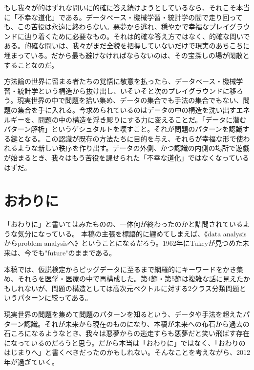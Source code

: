 もし我々が的はずれな問いに的確に答え続けようとしているなら、それこそ本当に「不幸な道化」である。データベース・機械学習・統計学の間で走り回っても、この苦役は永遠に終わらない。悪夢から逃れ、穏やかで幸福なプレイグラウンドに辿り着くために必要なもの。それは的確な答え方ではなく、的確な問いである。的確な問いは、我々がまだ全貌を把握していないだけで現実のあちこちに埋まっている。だから最も避けなければならないのは、その宝探しの場が閑散とすることなのだ。

方法論の世界に留まる者たちの覚悟に敬意を払ったら、データベース・機械学習・統計学という構造から抜け出し、いそいそと次のプレイグラウンドに移ろう。現実世界の中で問題を拾い集め、データの集合でも手法の集合でもない、問題の集合を手に入れる。今求められているのはデータの中の構造を洗い出すエネルギーを、問題の中の構造を浮き彫りにする力に変えることだ。「データに潜むパターン解析」というゲシュタルトを壊すこと。それが問題のパターンを認識する鍵となる。この認識が既存の方法たちに目的を与え、それらが幸福な形で使われるような新しい秩序を作り出す。データの外側、かつ認識の内側の場所で遊戯が始まるとき、我々はもう苦役を課せられた「不幸な道化」ではなくなっているはずだ。

\section{おわりに}
「おわりに」と書いてはみたものの、一体何が終わったのかと詰問されているような気分になっている。
本稿の主張を標語的に纏めてしまえば、《data analysisからproblem analysisへ》ということになるだろう。1962年にTukeyが見つめた未来は、今でも"future"のままである。

本稿では、仮説検定からビッグデータに至るまで網羅的にキーワードをかき集め、それらを医学・医療の中で再構成した。第4節・第5節は複雑な話に見えたかもしれないが、問題の構造としては高次元ベクトルに対する2クラス分類問題というパターンに絞ってある。

現実世界の問題を集めて問題のパターンを知るという、データや手法を超えたパターン認識。それが未来から現在のものになり、本稿が未来への布石から過去の石ころになるようなとき、我々は悪夢からの逃走すらも悪夢だと笑い飛ばす存在になっているのだろうと思う。だから本当は「おわりに」ではなく、「おわりのはじまりへ」と書くべきだったのかもしれない。そんなことを考えながら、2012年が過ぎていく。




